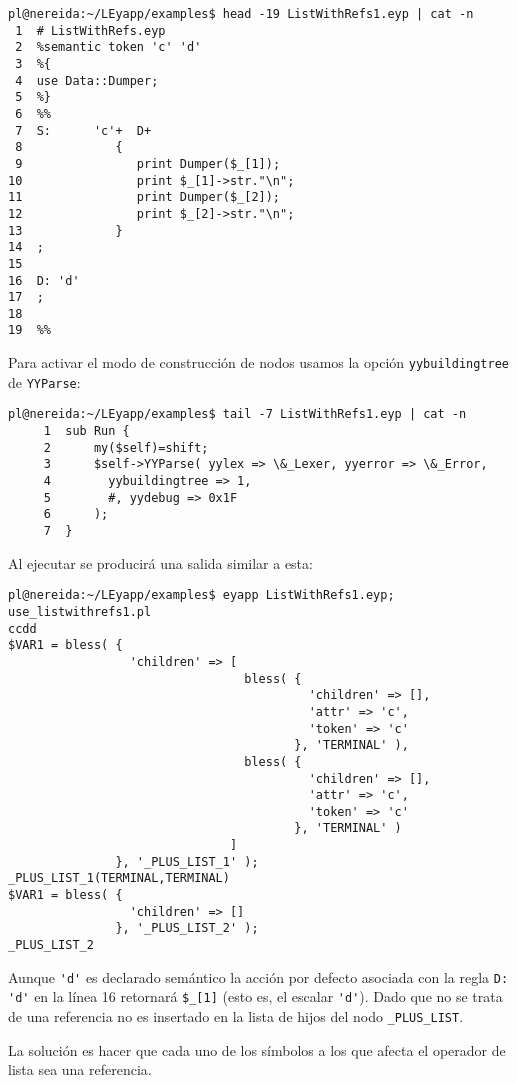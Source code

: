 \begin{verbatim}
pl@nereida:~/LEyapp/examples$ head -19 ListWithRefs1.eyp | cat -n
 1  # ListWithRefs.eyp
 2  %semantic token 'c' 'd'
 3  %{
 4  use Data::Dumper;
 5  %}
 6  %%
 7  S:      'c'+  D+
 8             {
 9                print Dumper($_[1]);
10                print $_[1]->str."\n";
11                print Dumper($_[2]);
12                print $_[2]->str."\n";
13             }
14  ;
15
16  D: 'd'
17  ;
18
19  %%
\end{verbatim}
Para activar el modo de construcción de nodos usamos la opción \verb|yybuildingtree|
de \verb|YYParse|:

\begin{verbatim}
pl@nereida:~/LEyapp/examples$ tail -7 ListWithRefs1.eyp | cat -n
     1  sub Run {
     2      my($self)=shift;
     3      $self->YYParse( yylex => \&_Lexer, yyerror => \&_Error,
     4        yybuildingtree => 1,
     5        #, yydebug => 0x1F
     6      );
     7  }

\end{verbatim}
Al ejecutar se producirá una salida similar a esta:
\begin{verbatim}
pl@nereida:~/LEyapp/examples$ eyapp ListWithRefs1.eyp; use_listwithrefs1.pl
ccdd
$VAR1 = bless( {
                 'children' => [
                                 bless( {
                                          'children' => [],
                                          'attr' => 'c',
                                          'token' => 'c'
                                        }, 'TERMINAL' ),
                                 bless( {
                                          'children' => [],
                                          'attr' => 'c',
                                          'token' => 'c'
                                        }, 'TERMINAL' )
                               ]
               }, '_PLUS_LIST_1' );
_PLUS_LIST_1(TERMINAL,TERMINAL)
$VAR1 = bless( {
                 'children' => []
               }, '_PLUS_LIST_2' );
_PLUS_LIST_2
\end{verbatim}

Aunque \verb|'d'| es declarado semántico la acción por
defecto asociada con la regla \verb|D: 'd'| en la línea 16 retornará
\verb|$_[1]| (esto es, el escalar \verb|'d'|). Dado que no se trata
de una referencia no es insertado en la lista de hijos del nodo
\verb|_PLUS_LIST|.


La solución es hacer que cada uno de los símbolos a los que afecta el operador
de lista sea una referencia. 

